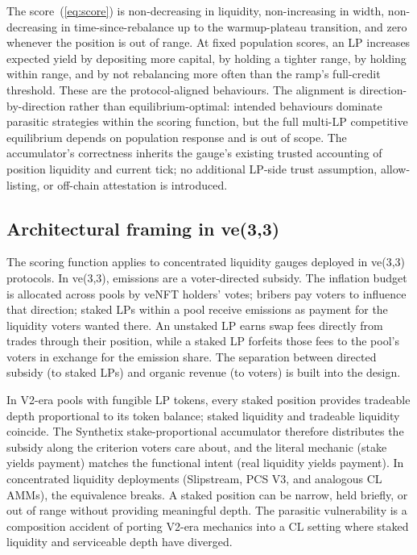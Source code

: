 \documentclass[11pt,a4paper]{article}
\theoremstyle{definition}
\theoremstyle{plain}
\theoremstyle{remark}
\begin{document}
The score~(\ref{eq:score}) is non-decreasing in liquidity, non-increasing in width, non-decreasing in time-since-rebalance up to the warmup-plateau transition, and zero whenever the position is out of range. At fixed population scores, an LP increases expected yield by depositing more capital, by holding a tighter range, by holding within range, and by not rebalancing more often than the ramp's full-credit threshold. These are the protocol-aligned behaviours. The alignment is direction-by-direction rather than equilibrium-optimal: intended behaviours dominate parasitic strategies within the scoring function, but the full multi-LP competitive equilibrium depends on population response and is out of scope. The accumulator's correctness inherits the gauge's existing trusted accounting of position liquidity and current tick; no additional LP-side trust assumption, allow-listing, or off-chain attestation is introduced.

\subsection{Architectural framing in ve(3,3)}\label{sec:ve33}

The scoring function applies to concentrated liquidity gauges deployed in ve(3,3) protocols. In ve(3,3)\cite{cronje2022}, emissions are a voter-directed subsidy. The inflation budget is allocated across pools by veNFT holders' votes; bribers pay voters to influence that direction; staked LPs within a pool receive emissions as payment for the liquidity voters wanted there. An unstaked LP earns swap fees directly from trades through their position, while a staked LP forfeits those fees to the pool's voters in exchange for the emission share. The separation between directed subsidy (to staked LPs) and organic revenue (to voters) is built into the design.

In V2-era pools with fungible LP tokens, every staked position provides tradeable depth proportional to its token balance; staked liquidity and tradeable liquidity coincide. The Synthetix stake-proportional accumulator therefore distributes the subsidy along the criterion voters care about, and the literal mechanic (stake yields payment) matches the functional intent (real liquidity yields payment). In concentrated liquidity deployments (Slipstream, PCS V3, and analogous CL AMMs), the equivalence breaks. A staked position can be narrow, held briefly, or out of range without providing meaningful depth. The parasitic vulnerability\cite{ryan2026c} is a composition accident of porting V2-era mechanics into a CL setting where staked liquidity and serviceable depth have diverged.
\end{document}
